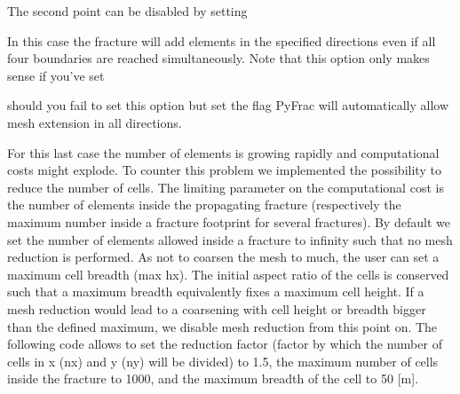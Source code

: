 \documentclass[letterpaper,10pt,english]{sphinxmanual}
\begin{document}
\sphinxAtStartPar
The second point can be disabled by setting

\begin{sphinxVerbatim}[commandchars=\\\{\}]
  
\end{sphinxVerbatim}

\sphinxAtStartPar
In this case the fracture will add elements in the specified directions even if all four boundaries are reached
simultaneously. Note that this option only makes sense if you’ve set

\begin{sphinxVerbatim}[commandchars=\\\{\}]
\PYG{p}{[}\PYG{p}{]}
\end{sphinxVerbatim}

\sphinxAtStartPar
should you fail to set this option but set the flag PyFrac will automatically allow mesh extension in all directions.

\sphinxAtStartPar
For this last case the number of elements is growing rapidly and computational costs might explode. To counter this
problem we implemented the possibility to reduce the number of cells. The limiting parameter on the computational cost
is the number of elements inside the propagating fracture (respectively the maximum number inside a fracture footprint
for several fractures). By default we set the number of elements allowed inside a fracture to infinity such that no mesh
reduction is performed. As not to coarsen the mesh to much, the user can set a maximum cell breadth (max hx). The
initial aspect ratio of the cells is conserved such that a maximum breadth equivalently fixes a maximum cell height. If
a mesh reduction would lead to a coarsening with cell height or breadth bigger than the defined maximum, we disable mesh
reduction from this point on. The following code allows to set the reduction factor (factor by which the number of cells
in x (nx) and y (ny) will be divided) to 1.5, the maximum number of cells inside the fracture to 1000, and the maximum
breadth of the cell to 50 {[}m{]}.

\begin{sphinxVerbatim}[commandchars=\\\{\}]
  
  
  
\end{sphinxVerbatim}
\end{document}
